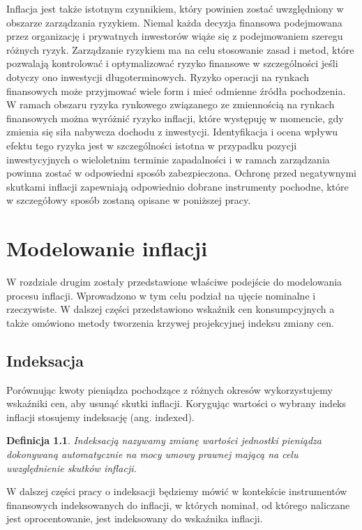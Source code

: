 \documentclass{mini}
\theoremstyle{mythstyle}
\newtheorem{Definicja}{Definicja}[chapter]
\begin{document}
	Inflacja jest także istotnym czynnikiem, który powinien zostać uwzględniony w obszarze zarządzania ryzykiem. Niemal każda decyzja finansowa podejmowana przez organizację i prywatnych inwestorów wiąże się z podejmowaniem szeregu różnych ryzyk. Zarządzanie ryzykiem ma na celu stosowanie zasad i metod, które pozwalają kontrolować i optymalizować ryzyko finansowe w szczególności jeśli dotyczy ono inwestycji długoterminowych. Ryzyko operacji na rynkach finansowych może przyjmować wiele form i mieć odmienne źródła pochodzenia. W ramach obszaru  ryzyka rynkowego związanego ze zmiennością na rynkach finansowych można wyróżnić ryzyko inflacji, które występuję w momencie, gdy zmienia się siła nabywcza dochodu z inwestycji. Identyfikacja i ocena wpływu efektu tego ryzyka jest w szczególności istotna w przypadku pozycji inwestycyjnych o wieloletnim terminie zapadalności i w ramach zarządzania powinna zostać w odpowiedni sposób zabezpieczona. Ochronę przed negatywnymi skutkami inflacji zapewniają odpowiednio dobrane instrumenty pochodne, które w szczegółowy sposób zostaną opisane w poniższej pracy.
	
\chapter{Modelowanie inflacji}

	W rozdziale drugim zostały przedstawione właściwe podejście do modelowania procesu inflacji. Wprowadzono w tym celu podział na ujęcie nominalne i rzeczywiste. W dalszej części przedstawiono wskaźnik cen konsumpcyjnych a także omówiono metody tworzenia krzywej projekcyjnej indeksu zmiany cen.
	
	\section{Indeksacja}
	
	Porównując kwoty pieniądza pochodzące z różnych okresów wykorzystujemy wskaźniki cen, aby usunąć skutki inflacji. Korygując wartości  o wybrany indeks inflacji stosujemy indeksację (ang. indexed).\\
	
	\begin{Definicja}
		Indeksacją nazywamy zmianę wartości jednostki pieniądza dokonywaną automatycznie na mocy umowy prawnej mającą na celu uwzględnienie skutków inflacji.
	\end{Definicja}

	W dalszej części pracy o indeksacji będziemy mówić w kontekście instrumentów finansowych indeksowanych do inflacji, w których nominał, od którego naliczane jest oprocentowanie, jest indeksowany do wskaźnika inflacji.
	
\end{document}
